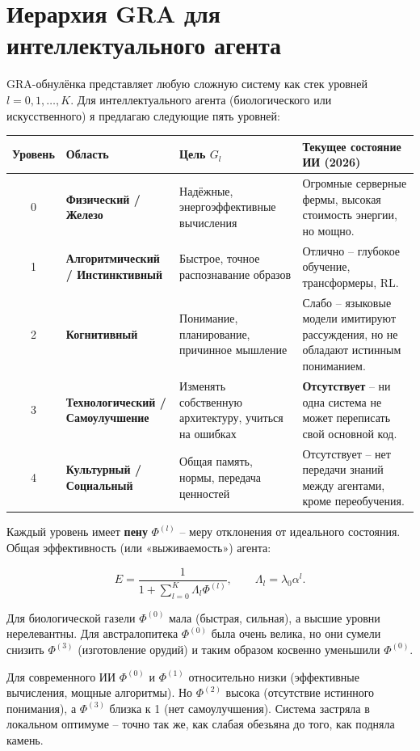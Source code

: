 \documentclass[12pt,a4paper]{article}
\begin{document}
\section{Иерархия GRA для интеллектуального агента}

GRA-обнулёнка представляет любую сложную систему как стек уровней \(l = 0, 1, \dots, K\). Для интеллектуального агента (биологического или искусственного) я предлагаю следующие пять уровней:

\begin{table}[h]
\centering
\begin{tabular}{|c|l|l|p{5cm}|}
\hline
Уровень & Область & Цель \(G_l\) & Текущее состояние ИИ (2026) \\
\hline
0 & \textbf{Физический / Железо} & Надёжные, энергоэффективные вычисления & Огромные серверные фермы, высокая стоимость энергии, но мощно. \\
\hline
1 & \textbf{Алгоритмический / Инстинктивный} & Быстрое, точное распознавание образов & Отлично – глубокое обучение, трансформеры, RL. \\
\hline
2 & \textbf{Когнитивный} & Понимание, планирование, причинное мышление & Слабо – языковые модели имитируют рассуждения, но не обладают истинным пониманием. \\
\hline
3 & \textbf{Технологический / Самоулучшение} & Изменять собственную архитектуру, учиться на ошибках & \textbf{Отсутствует} – ни одна система не может переписать свой основной код. \\
\hline
4 & \textbf{Культурный / Социальный} & Общая память, нормы, передача ценностей & Отсутствует – нет передачи знаний между агентами, кроме переобучения. \\
\hline
\end{tabular}
\end{table}

Каждый уровень имеет \textbf{пену} \(\Phi^{(l)}\) – меру отклонения от идеального состояния. Общая эффективность (или «выживаемость») агента:

\[
E = \frac{1}{1 + \sum_{l=0}^{K} \Lambda_l \Phi^{(l)}}, \qquad \Lambda_l = \lambda_0 \alpha^l.
\]

Для биологической газели \(\Phi^{(0)}\) мала (быстрая, сильная), а высшие уровни нерелевантны. Для австралопитека \(\Phi^{(0)}\) была очень велика, но они сумели снизить \(\Phi^{(3)}\) (изготовление орудий) и таким образом косвенно уменьшили \(\Phi^{(0)}\).

Для современного ИИ \(\Phi^{(0)}\) и \(\Phi^{(1)}\) относительно низки (эффективные вычисления, мощные алгоритмы). Но \(\Phi^{(2)}\) высока (отсутствие истинного понимания), а \(\Phi^{(3)}\) близка к 1 (нет самоулучшения). Система застряла в локальном оптимуме – точно так же, как слабая обезьяна до того, как подняла камень.
\end{document}
